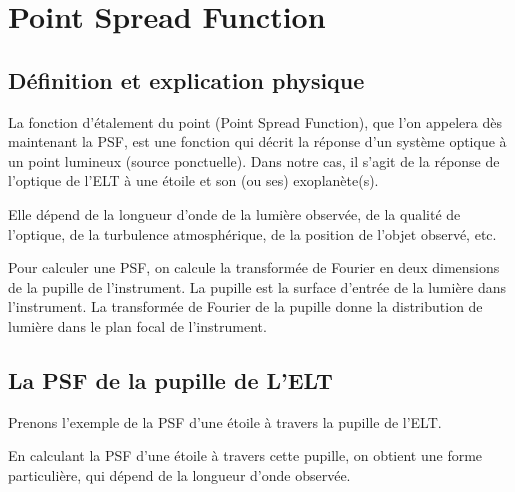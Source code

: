 \section{Point Spread Function}

\subsection{Définition et explication physique}

La fonction d'étalement du point (Point Spread Function), que l'on appelera dès maintenant la PSF, est une fonction qui décrit la réponse d'un système optique à un point lumineux (source ponctuelle). Dans notre cas, il s'agit de la réponse de l'optique de l'ELT à une étoile et son (ou ses) exoplanète(s).

Elle dépend de la longueur d'onde de la lumière observée, de la qualité de l'optique, de la turbulence atmosphérique, de la position de l'objet observé, etc. 

Pour calculer une PSF, on calcule la transformée de Fourier en deux dimensions de la pupille de l'instrument. La pupille est la surface d'entrée de la lumière dans l'instrument. La transformée de Fourier de la pupille donne la distribution de lumière dans le plan focal de l'instrument.



\subsection{La PSF de la pupille de L’ELT}

Prenons l'exemple de la PSF d'une étoile à travers la pupille de l'ELT.


En calculant la PSF d'une étoile à travers cette pupille, on obtient une forme particulière, qui dépend de la longueur d'onde observée.

